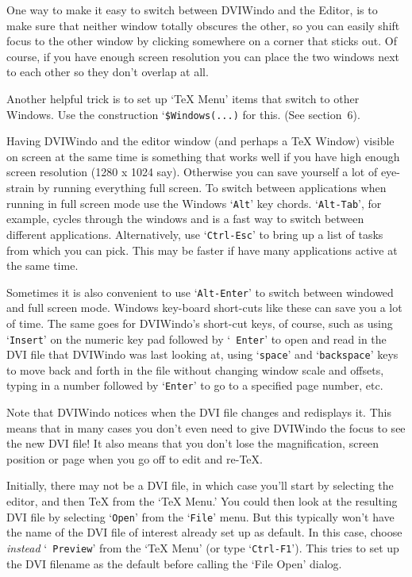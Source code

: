 One way to make it easy to switch between DVIWindo and the Editor, is to make
sure that neither window totally obscures the other, so you can easily shift
focus to the other window by clicking somewhere on a corner that sticks out.
Of course, if you have enough screen resolution you can place the two windows
next to each other so they don't overlap at all.  

Another helpful trick is to set up `TeX Menu' items that switch to other
Windows.  Use the construction `\verb|$Windows(...)| for this.
(See section~6). %

Having DVIWindo and the editor window (and perhaps a {\TeX} Window) visible on
screen at the same time is something that works well if you have high enough
screen resolution (1280 x 1024 say).  Otherwise you can save yourself
a lot of eye-strain by running everything full screen.  To switch between
applications when running in full screen mode use the Windows `{\tt Alt}' key
chords. `{\tt Alt-Tab}', for example, cycles through the windows and is a
fast way to switch between different applications.  Alternatively, use
`{\tt Ctrl-Esc}' to  bring up a list of tasks from which you can pick.  This
may be faster if have %
many applications active at the same time. 


Sometimes it is also convenient to use `{\tt Alt-Enter}' to switch between
windowed and full screen mode.  Windows key-board short-cuts like these
can save you a lot of time.  The same goes for DVIWindo's short-cut keys,
of course,
such as using `{\tt Insert}' on the numeric key pad followed by `{\tt
Enter}' to open and read in the DVI file that DVIWindo was last looking at,
using `{\tt space}' and `{\tt backspace}' keys to move back and forth in the
file without changing window scale and offsets, typing in a number followed
by `{\tt Enter}' to go to a specified page number, etc. 

Note that DVIWindo notices when the DVI file changes and redisplays it.
This means that in many cases you don't even need to give DVIWindo the
focus to see the new DVI file!  It also means that you don't lose the
magnification, screen position or page when you go off to edit and re-{\TeX}.

Initially, there may not be a DVI file, in which case you'll start by
selecting the editor, and then {\TeX} from the `TeX Menu.'  You could then look
at the resulting DVI file by selecting `{\tt Open}' from the `{\tt File}'
menu.  But this typically won't have the name of the DVI file of interest 
already set up as default. In this case, choose {\it instead\/} `{\tt
Preview}' from the `TeX Menu' (or type `{\tt Ctrl-F1}'). 
This tries to set up the DVI filename as the default before
calling the `File Open' dialog. 


